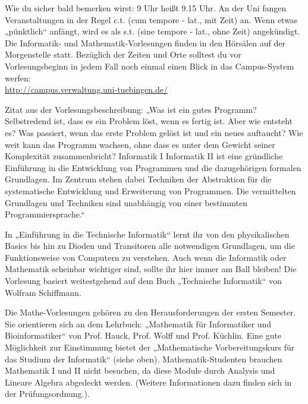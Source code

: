 
Wie du sicher bald bemerken wirst: 9 Uhr heißt 9.15 Uhr. An der Uni fangen Veranstaltungen in der Regel c.t. (cum
tempore - lat., mit Zeit) an. Wenn etwas „pünktlich“ anfängt, wird es als s.t. (sine tempore - lat., ohne
Zeit) angekündigt. Die Informatik- und Mathematik-Vorlesungen finden in den Hörsälen auf der
Morgenstelle statt. Bezüglich der Zeiten und Orte solltest du vor Vorlesungsbeginn in jedem Fall noch einmal einen Blick in das Campus-System werfen:\\
\url{http://campus.verwaltung.uni-tuebingen.de/}

\ifbachelor
{}
Zitat aus der Vorlesungsbeschreibung: „Was ist ein gutes Programm? Selbstredend ist, dass es ein
Problem löst, wenn es fertig ist. Aber wie entsteht es? Was passiert, wenn das erste Problem gelöst
ist und ein neues auftaucht? Wie weit kann das Programm wachsen, ohne dass es unter dem Gewicht
seiner Komplexität zusammenbricht? 
\ifwintersemester
Informatik I 
\fi
\ifsommersemester
Informatik II
\fi 
ist eine gründliche Einführung in die Entwicklung
von Programmen und die dazugehörigen formalen Grundlagen. Im Zentrum stehen dabei Techniken der Abstraktion
für die systematische Entwicklung und Erweiterung von Programmen. Die vermittelten Grundlagen und Techniken
sind unabhängig von einer bestimmten Programmiersprache.“


\ifinfo
\ifwintersemester
{}
In „Einführung in die Technische Informatik“ lernt ihr von den physikalischen Basics bis hin zu Dioden und Transitoren alle notwendigen Grundlagen, um die Funktionsweise von Computern zu verstehen. Auch wenn die Informatik oder Mathematik scheinbar wichtiger sind, sollte ihr hier immer am Ball bleiben! Die Vorlesung basiert weitestgehend auf dem Buch „Technische Informatik“ von Wolfram Schiffmann.
\fi
\fi

Die Mathe-Vorlesungen gehören zu den Herausforderungen der ersten Semester. Sie orientieren
sich an dem Lehrbuch: „Mathematik für Informatiker und Bioinformatiker“ von Prof.
Hauck, Prof. Wolff und Prof. Küchlin. Eine gute Möglichkeit zur Einstimmung bietet der „Mathematische
Vorbereitungskurs für das Studium der Informatik“ (siehe oben).
\iflehramt
Mathematik-Studenten brauchen Mathematik I
und II nicht besuchen, da diese Module durch Analysis und Lineare Algebra
abgedeckt werden. (Weitere Informationen dazu finden sich in der
Prüfungsordnung.).
\fi
\fi\ \\\\